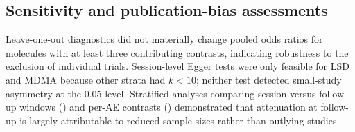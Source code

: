 
\subsection{Sensitivity and publication-bias assessments}
Leave-one-out diagnostics did not materially change pooled odds ratios for molecules with at least three contributing contrasts, indicating robustness to the exclusion of individual trials. Session-level Egger tests were only feasible for LSD and MDMA because other strata had $k<10$; neither test detected small-study asymmetry at the 0.05 level. Stratified analyses comparing session versus follow-up windows () and per-AE contrasts () demonstrated that attenuation at follow-up is largely attributable to reduced sample sizes rather than outlying studies.
